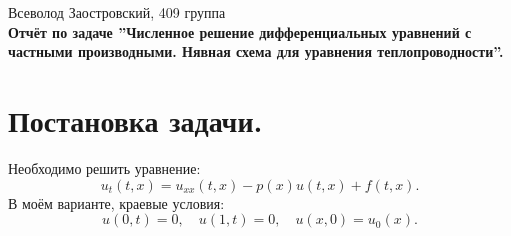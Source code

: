 \documentclass[14pt,a4paper]{extarticle}
\newcommand{\1}{\mathbbm{1}}
\begin{document}
\begin{center}
    {Всеволод Заостровский, 409 группа}\\
    {\bfseries Отчёт по задаче ''Численное решение дифференциальных уравнений с частными производными. Нявная схема для уравнения теплопроводности''.\\}
    \vspace{1cm}
\end{center}

\section{Постановка задачи.} Необходимо решить уравнение:
\begin{equation} \label{diffeq1}
    u_t(t, x) = u_{xx}(t, x) - p(x) u(t, x) + f(t, x).
\end{equation}
В моём варианте, краевые условия:
\begin{equation} \label{diffeqedge}
    u(0, t) = 0, \quad u(1, t) = 0, \quad u(x, 0) = u_0(x). 
\end{equation}
\end{document}
